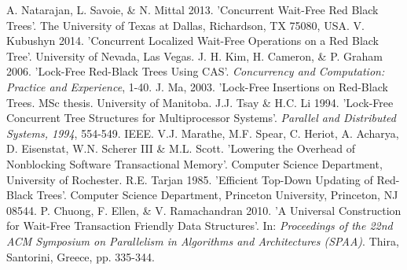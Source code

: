 \documentclass[letterpaper, 10 pt, conference]{ieeeconf}
\begin{document}
	\begin{thebibliography}{99}
		
		 A. Natarajan, L. Savoie, \& N. Mittal 2013. 'Concurrent Wait-Free Red Black Trees'. The University of Texas at Dallas, Richardson, TX 75080, USA.
		 V. Kubushyn 2014. 'Concurrent Localized Wait-Free Operations on a Red Black Tree'. University of Nevada, Las Vegas.
		 J. H. Kim, H. Cameron, \& P. Graham 2006. 'Lock-Free Red-Black Trees Using CAS'. \textit{Concurrency and Computation: Practice and Experience}, 1-40.
		 J. Ma, 2003. 'Lock-Free Insertions on Red-Black Trees. MSc thesis. University of Manitoba.
		 J.J. Tsay \& H.C. Li 1994. 'Lock-Free Concurrent Tree Structures for Multiprocessor Systems'. \textit{Parallel and Distributed Systems, 1994}, 554-549. IEEE.
		 V.J. Marathe, M.F. Spear, C. Heriot, A. Acharya, D. Eisenstat, W.N. Scherer III \& M.L. Scott. 'Lowering the Overhead of Nonblocking Software Transactional Memory'. Computer Science Department, University of Rochester.
		 R.E. Tarjan 1985. 'Efficient Top-Down Updating of Red-Black Trees'. Computer Science Department, Princeton University, Princeton, NJ 08544. 
		 P. Chuong, F. Ellen, \& V. Ramachandran 2010. 'A Universal Construction for Wait-Free Transaction Friendly Data Structures'. In: \textit{Proceedings of the 22nd ACM Symposium on Parallelism in Algorithms and Architectures (SPAA)}. Thira, Santorini, Greece, pp. 335-344.
				
	\end{thebibliography}
	
	
	
	
\end{document}
